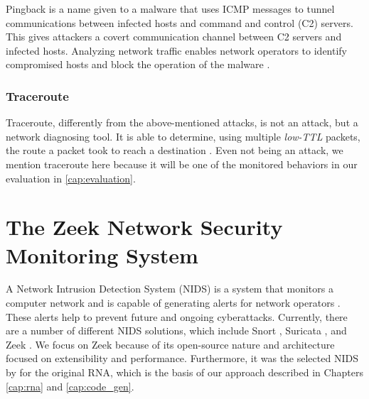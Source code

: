 Pingback is a name given to a malware that uses ICMP messages to tunnel communications between infected hosts and command and control (C2) servers. This gives attackers a covert communication channel between C2 servers and infected hosts. Analyzing network traffic enables network operators to identify compromised hosts and block the operation of the malware \cite{PingbackAttack}.

\subsubsection*{Traceroute}
\label{sec:bg:traceroute}

Traceroute, differently from the above-mentioned attacks, is not an attack, but a network diagnosing tool. It is able to determine, using multiple \textit{low-TTL} packets, the route a packet took to reach a destination \cite{Traceroute}. Even not being an attack, we mention traceroute here because it will be one of the monitored behaviors in our evaluation in \autoref{cap:evaluation}.






\section{The Zeek Network Security Monitoring System}
\label{sec:bg:zeek}

A Network Intrusion Detection System (NIDS) is a system that monitors a computer network and is capable of generating alerts for network operators \cite{NIDSScienceDirect}. These alerts help to prevent future and ongoing cyberattacks. Currently, there are a number of different NIDS solutions, which include Snort \cite{SnortWebsite}, Suricata \cite{SuricataWebsite}, and Zeek \cite{ZeekWebsite}. We focus on Zeek because of its open-source nature and architecture focused on extensibility and performance. Furthermore, it was the selected NIDS by  for the original RNA, which is the basis of our approach described in Chapters \ref{cap:rna} and \ref{cap:code_gen}.

